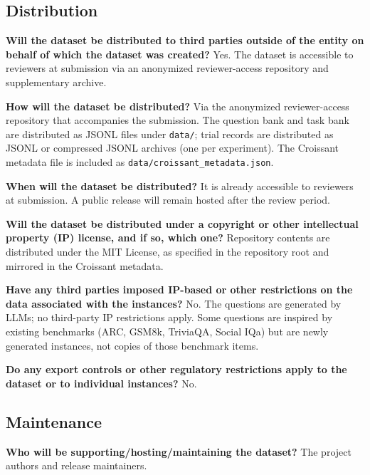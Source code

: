 \subsection*{Distribution}

\textbf{Will the dataset be distributed to third parties outside of the entity on
behalf of which the dataset was created?}
Yes. The dataset is accessible to reviewers at submission via an anonymized
reviewer-access repository and supplementary archive.

\textbf{How will the dataset be distributed?}
Via the anonymized reviewer-access repository that accompanies the submission. The
question bank and task bank are distributed as JSONL files under \texttt{data/};
trial records are distributed as JSONL or compressed JSONL archives (one per
experiment). The Croissant metadata file is included as
\texttt{data/croissant\_metadata.json}.

\textbf{When will the dataset be distributed?}
It is already accessible to reviewers at submission. A public release will remain
hosted after the review period.

\textbf{Will the dataset be distributed under a copyright or other intellectual
property (IP) license, and if so, which one?}
Repository contents are distributed under the MIT License, as specified in the
repository root and mirrored in the Croissant metadata.

\textbf{Have any third parties imposed IP-based or other restrictions on the data
associated with the instances?}
No. The questions are generated by LLMs; no third-party IP restrictions apply.
Some questions are inspired by existing benchmarks (ARC, GSM8k, TriviaQA, Social IQa)
but are newly generated instances, not copies of those benchmark items.

\textbf{Do any export controls or other regulatory restrictions apply to the dataset or
to individual instances?}
No.

\subsection*{Maintenance}

\textbf{Who will be supporting/hosting/maintaining the dataset?}
The \mirror{} project authors and release maintainers.

